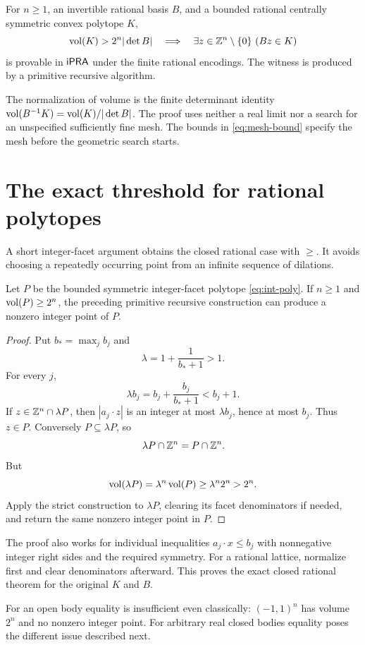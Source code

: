 \begin{corollary}\label{cor:poly}
For \(n\geq1\), an invertible rational basis \(B\), and a
bounded rational centrally symmetric convex polytope \(K\),
\[
 \operatorname{vol}(K)>2^n|\det B|
 \quad\Longrightarrow\quad
 \exists z\in\mathbb Z^n\setminus\{0\}\ (Bz\in K)
\]
is provable in \(\mathsf{iPRA}\) under the finite rational encodings.
The witness is produced by a primitive recursive algorithm.
\end{corollary}

The normalization of volume is the finite determinant
identity \(\operatorname{vol}(B^{-1}K)=\operatorname{vol}(K)/|\det B|\).
The proof uses neither a real limit nor a search for an
unspecified sufficiently fine mesh. The bounds in
\cref{eq:mesh-bound} specify the mesh before the geometric
search starts.

\section{The exact threshold for rational polytopes}\label{sec:equality}

A short integer-facet argument obtains the closed rational
case with \(\geq\). It avoids choosing a repeatedly
occurring point from an infinite sequence of dilations.

\begin{theorem}\label{thm:equality}
Let \(P\) be the bounded symmetric integer-facet polytope
\cref{eq:int-poly}. If \(n\geq1\) and \(\operatorname{vol}(P)\geq2^n\),
the preceding primitive recursive construction can produce
a nonzero integer point of \(P\).
\end{theorem}

\begin{proof}
Put \(b_*=\max_jb_j\) and
\[
                         \lambda=1+\frac1{b_*+1}>1.
\]
For every \(j\),
\[
                 \lambda b_j=b_j+\frac{b_j}{b_*+1}<b_j+1.
\]
If \(z\in\mathbb Z^n\cap\lambda P\), then \(|a_j\cdot z|\)
is an integer at most \(\lambda b_j\), hence at most
\(b_j\). Thus \(z\in P\). Conversely
\(P\subseteq\lambda P\), so
\begin{equation}\label{eq:same-lattice}
                        \lambda P\cap\mathbb Z^n=P\cap\mathbb Z^n.
\end{equation}
But
\[
       \operatorname{vol}(\lambda P)=\lambda^n\operatorname{vol}(P)
                    \geq\lambda^n2^n>2^n.
\]
Apply the strict construction to \(\lambda P\), clearing
its facet denominators if needed, and return the same
nonzero integer point in \(P\).
\end{proof}

The proof also works for individual inequalities
\(a_j\cdot x\leq b_j\) with nonnegative integer right
sides and the required symmetry.
For a rational lattice, normalize first and clear
denominators afterward. This proves the exact closed
rational theorem for the original \(K\) and \(B\).

For an open body equality is insufficient even classically:
\((-1,1)^n\) has volume \(2^n\) and no nonzero integer
point. For arbitrary real closed bodies equality poses
the different issue described next.
